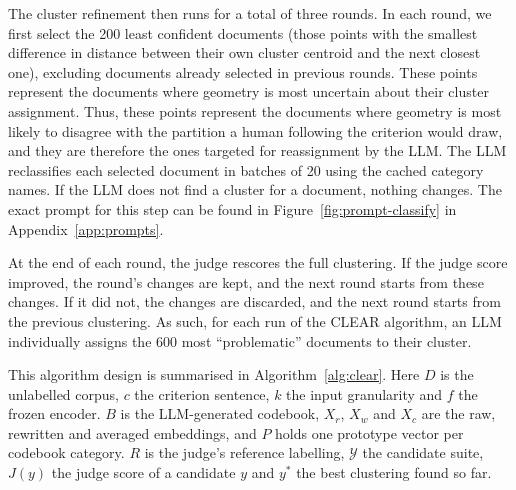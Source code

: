 \documentclass[11pt,a4paper,oneside]{report}
\begin{document}
The cluster refinement then runs for a total of three rounds. In each round, we first select the 200 least confident documents (those points with the smallest difference in distance between their own cluster centroid and the next closest one), excluding documents already selected in previous rounds. These points represent the documents where geometry is most uncertain about their cluster assignment. Thus, these points represent the documents where geometry is most likely to disagree with the partition a human following the criterion would draw, and they are therefore the ones targeted for reassignment by the LLM. The LLM reclassifies each selected document in batches of 20 using the cached category names. If the LLM does not find a cluster for a document, nothing changes. The exact prompt for this step can be found in Figure~\ref{fig:prompt-classify} in Appendix~\ref{app:prompts}.

At the end of each round, the judge rescores the full clustering. If the judge score improved, the round's changes are kept, and the next round starts from these changes. If it did not, the changes are discarded, and the next round starts from the previous clustering. As such, for each run of the CLEAR algorithm, an LLM individually assigns the 600 most ``problematic'' documents to their cluster.

This algorithm design is summarised in Algorithm~\ref{alg:clear}. Here $D$ is the unlabelled corpus, $c$ the criterion sentence, $k$ the input granularity and $f$ the frozen encoder. $B$ is the LLM-generated codebook, $X_r$, $X_w$ and $X_c$ are the raw, rewritten and averaged embeddings, and $P$ holds one prototype vector per codebook category. $R$ is the judge's reference labelling, $\mathcal{Y}$ the candidate suite, $J(y)$ the judge score of a candidate $y$ and $y^{\ast}$ the best clustering found so far.
\end{document}
